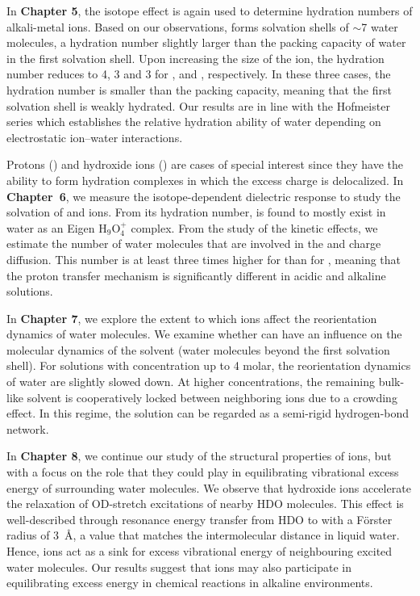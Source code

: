 In \textbf{Chapter 5}, the isotope effect is again used to determine hydration numbers of alkali-metal ions. Based on our observations,  forms solvation shells of $\sim$7 water molecules, a hydration number slightly larger than the packing capacity of water in the first solvation shell. Upon increasing the size of the ion, the hydration number reduces to 4, 3 and 3 for ,  and , respectively. In these three cases, the hydration number is smaller than the packing capacity, meaning that the first solvation shell is weakly hydrated. Our results are in line with the Hofmeister series which establishes the relative hydration ability of water depending on electrostatic ion--water interactions. 


Protons () and hydroxide ions () are cases of special interest since they have the ability to form hydration complexes in which the excess charge is delocalized. In \textbf{Chapter~6}, we measure the isotope-dependent dielectric response to study the solvation of  and  ions. From its hydration number,  is found to mostly exist in water as an Eigen H$_9$O$_4^+$ complex. From the study of the kinetic effects, we estimate the number of water molecules that are involved in the  and  charge diffusion. This number is at least three times higher for  than for , meaning that the proton transfer mechanism is significantly different in acidic and alkaline solutions. 


In \textbf{Chapter 7}, we explore the extent to which  ions affect the reorientation dynamics of water molecules. We examine whether  can have an influence on the molecular dynamics of the solvent (water molecules beyond the first solvation shell). For solutions with  concentration up to 4 molar, the reorientation dynamics of water are slightly slowed down. At higher  concentrations, the remaining bulk-like solvent is cooperatively locked between neighboring  ions due to a crowding effect. In this regime, the solution can be regarded as a semi-rigid hydrogen-bond network.


In \textbf{Chapter 8}, we continue our study of the structural properties of  ions, but with a focus on the role that they could play in equilibrating vibrational excess energy of surrounding water molecules. We observe that hydroxide ions accelerate the relaxation of OD-stretch excitations of nearby HDO molecules. This effect is well-described through resonance energy transfer from HDO to  with a F\"orster radius of 3~\AA, a value that matches the intermolecular distance in liquid water. Hence,  ions act as a sink for excess vibrational energy of neighbouring excited water molecules. Our results suggest that  ions may also participate in equilibrating excess energy in chemical reactions in alkaline environments.


